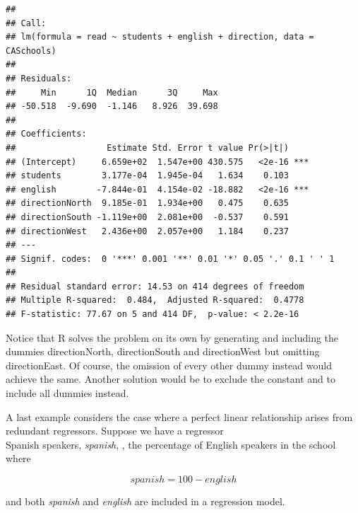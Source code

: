 \documentclass[]{book}
\newenvironment{Shaded}{\begin{snugshade}}{\end{snugshade}}
\newcommand{\CommentTok}[1]{\textcolor[rgb]{0.56,0.35,0.01}{\textit{#1}}}
\newcommand{\DataTypeTok}[1]{\textcolor[rgb]{0.13,0.29,0.53}{#1}}
\newcommand{\DecValTok}[1]{\textcolor[rgb]{0.00,0.00,0.81}{#1}}
\newcommand{\KeywordTok}[1]{\textcolor[rgb]{0.13,0.29,0.53}{\textbf{#1}}}
\newcommand{\NormalTok}[1]{#1}
\newcommand{\OperatorTok}[1]{\textcolor[rgb]{0.81,0.36,0.00}{\textbf{#1}}}
\newcommand{\StringTok}[1]{\textcolor[rgb]{0.31,0.60,0.02}{#1}}
\begin{document}
\begin{verbatim}
## 
## Call:
## lm(formula = read ~ students + english + direction, data = CASchools)
## 
## Residuals:
##     Min      1Q  Median      3Q     Max 
## -50.518  -9.690  -1.146   8.926  39.698 
## 
## Coefficients:
##                  Estimate Std. Error t value Pr(>|t|)    
## (Intercept)     6.659e+02  1.547e+00 430.575   <2e-16 ***
## students        3.177e-04  1.945e-04   1.634    0.103    
## english        -7.844e-01  4.154e-02 -18.882   <2e-16 ***
## directionNorth  9.185e-01  1.934e+00   0.475    0.635    
## directionSouth -1.119e+00  2.081e+00  -0.537    0.591    
## directionWest   2.436e+00  2.057e+00   1.184    0.237    
## ---
## Signif. codes:  0 '***' 0.001 '**' 0.01 '*' 0.05 '.' 0.1 ' ' 1
## 
## Residual standard error: 14.53 on 414 degrees of freedom
## Multiple R-squared:  0.484,  Adjusted R-squared:  0.4778 
## F-statistic: 77.67 on 5 and 414 DF,  p-value: < 2.2e-16
\end{verbatim}

Notice that R solves the problem on its own by generating and including
the dummies directionNorth, directionSouth and directionWest but
omitting directionEast. Of course, the omission of every other dummy
instead would achieve the same. Another solution would be to exclude the
constant and to include all dummies instead.

A last example considers the case where a perfect linear relationship
arises from redundant regressors. Suppose we have a regressor\\
Spanish speakers, \emph{spanish}, , the percentage of English speakers
in the school where

\begin{equation}
spanish = 100 - english  
\end{equation}

and both \emph{spanish} and \emph{english} are included in a regression
model.

\begin{Shaded}
\end{Shaded}
\end{document}
